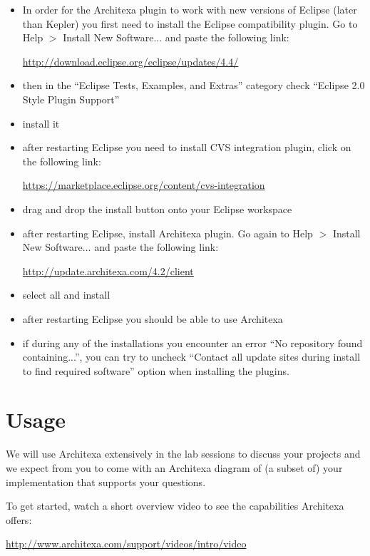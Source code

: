 \documentclass{article}
\begin{document}
\begin{itemize}

\item In order for the Architexa plugin to work with new versions of
  Eclipse (later than Kepler) you
  first need to install the Eclipse compatibility plugin. Go to Help
  $>$ Install New Software... and paste the following link:

\url{http://download.eclipse.org/eclipse/updates/4.4/}

\item then in the ``Eclipse Tests, Examples, and Extras'' category check ``Eclipse 2.0 Style Plugin Support''
\item install it

\item after restarting Eclipse you need to install CVS integration
  plugin, click on the following link:

\url{https://marketplace.eclipse.org/content/cvs-integration}

\item drag and drop the install button onto your Eclipse workspace

\item after restarting Eclipse, install Architexa plugin. Go again to Help
  $>$ Install New Software... and paste the following link:

\url{http://update.architexa.com/4.2/client}

\item select all and install
\item after restarting Eclipse you should be able to use Architexa
\item if during any of the installations you encounter an error ``No
  repository found containing...'', you can try to uncheck ``Contact
  all update sites during install to find required software'' option
  when installing the plugins.

\end{itemize}

\section{Usage}
We will use Architexa extensively in the lab sessions to discuss your
projects and we expect from you to come with an Architexa diagram of
(a subset of) your implementation that supports your questions.

To get started, watch a short overview video to see the
capabilities Architexa offers:


\url{http://www.architexa.com/support/videos/intro/video}
\end{document}
